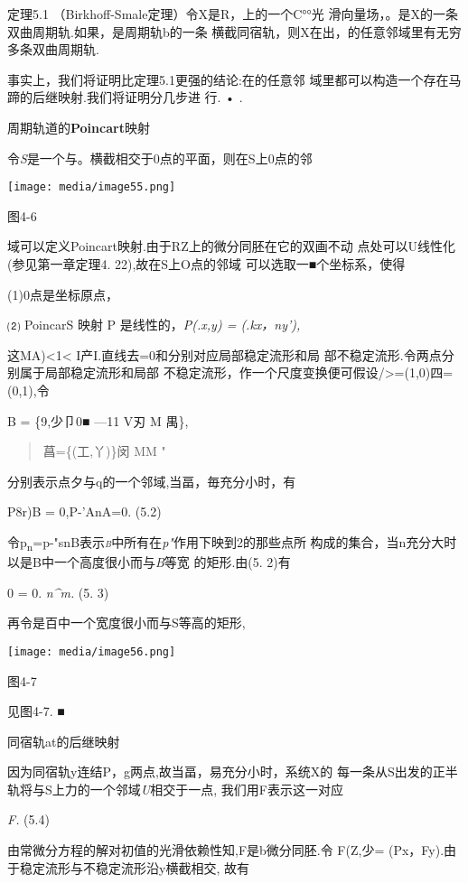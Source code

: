 \documentclass{article}
\begin{document}
定理5.1 （Birkhoff-Smale定理）令X是R，上的一个C°°光
滑向量场，。是X的一条双曲周期轨.如果，是周期轨b的一条
横截同宿轨，则X在出，的任意邻域里有无穷多条双曲周期轨.

事实上，我们将证明比定理5.1更强的结论:在的任意邻
域里都可以构造一个存在马蹄的后继映射.我们将证明分几步进 行. • .

周期轨道的\textbf{Poincart}映射

令\emph{S}是一个与。横截相交于0点的平面，则在S上0点的邻

\texttt{[image: media/image55.png]}

图4-6

域可以定义Poincart映射.由于RZ上的微分同胚在它的双画不动
点处可以U线性化(参见第一章定理4. 22),故在S上O点的邻域
可以选取一■个坐标系，使得

(1)0点是坐标原点，

⑵ PoincarS 映射 P 是线性的，\emph{P(.x,y) = (.kx，ny'),}

这M\textbar{}A)\textless{}1\textless{}
I产I.直线去=0和分别对应局部稳定流形和局
部不稳定流形.令两点分别属于局部稳定流形和局部
不稳定流形，作一个尺度变换便可假设/\textgreater{}=(1,0)四=(0,1),令

B = \{9,少卩0■ ---11 V\textbar{}刃 M 禺\},

\begin{quote}
菖=\{(工,丫)\}闵 MM "
\end{quote}

分别表示点夕与q的一个邻域,当畐，毎充分小时，有

P8r)B = 0,P-'AnA=0. (5.2)

令p\textsubscript{n}=p-"snB表示\emph{\textsc{b}}中所有在\emph{p"}作用下映到2的那些点所
构成的集合，当n充分大时以是B中一个高度很小而与\emph{B}等宽 的矩形.由(5.
2)有

0 = 0. \emph{n\^{}m.} (5. 3)

再令是百中一个宽度很小而与S等高的矩形,

\texttt{[image: media/image56.png]}

图4-7

见图4-7. ■

同宿轨at的后继映射

因为同宿轨y连结P，g两点,故当畐，易充分小时，系统X的
每一条从S出发的正半轨将与S上力的一个邻域\emph{U}相交于一点,
我们用F表示这一对应

\emph{F.} (5.4)

由常微分方程的解对初值的光滑依赖性知,F是b微分同胚.令 F(Z,少=
(Px，Fy).由于稳定流形与不稳定流形沿y横截相交, 故有
\end{document}
